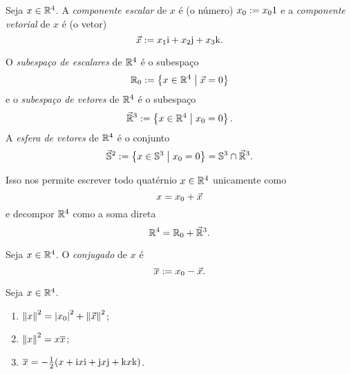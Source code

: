 \begin{definition}
Seja $x \in \mathbb{R}^4$. A \emph{componente escalar} de $x$ é (o número) ${x}_0 := x_0 1$ e a \emph{componente vetorial} de $x$ é (o vetor)
	\begin{equation*}
	\vec{x} := x_1 \mathrm{i} + x_2 \mathrm{j} + x_3 \mathrm{k}.
	\end{equation*}

O \emph{subespaço de escalares} de $\mathbb{R}^4$ é o subespaço
	\begin{equation*}
	{\mathbb{R}}_0 := \left\{{x \in \mathbb{R}^4}\;\middle\vert\;{\vec{x}=0}\right\}
	\end{equation*}
e o \emph{subespaço de vetores} de $\mathbb{R}^4$ é o subespaço
	\begin{equation*}
	\vec{\mathbb{R}}^3 := \left\{{x \in \mathbb{R}^4}\;\middle\vert\;{{x}_0=0}\right\}.
	\end{equation*}
A \emph{esfera de vetores} de $\mathbb{R}^4$ é o conjunto
	\begin{equation*}
	\vec{\mathbb{S}}^2 := \left\{{x \in \mathbb{S}^3}\;\middle\vert\;{{x}_0=0}\right\} = \mathbb{S}^3 \cap \vec{\mathbb{R}}^3.
	\end{equation*}
\end{definition}

Isso nos permite escrever todo quatérnio $x \in \mathbb{R}^4$ unicamente como
	\begin{equation*}
	x = {x}_0 + \vec{x}
	\end{equation*}
e decompor $\mathbb{R}^4$ como a soma direta
	\begin{equation*}
	\mathbb{R}^4 = {\mathbb{R}}_0 + \vec{\mathbb{R}}^3.
	\end{equation*}

\begin{definition}
Seja $x \in \mathbb{R}^4$. O \emph{conjugado} de $x$ é
	\begin{equation*}
	\overline{x} := {x}_0-\vec{x}.
	\end{equation*}
\end{definition}

\begin{exercise}
Seja $x \in \mathbb{R}^4$.
	\begin{enumerate}
	\item $\left\Vert{x}\right\Vert^2 = \left\vert{{x}_0}\right\vert^2 + \left\Vert{\vec{x}}\right\Vert^2$;
	\item $\left\Vert{x}\right\Vert^2 = x\overline{x}$;
	\item $\overline{x} = -\frac{1}{2}(x + \mathrm{i} x \mathrm{i} + \mathrm{j} x \mathrm{j} + \mathrm{k} x \mathrm{k})$.
	\end{enumerate}
\end{exercise}

